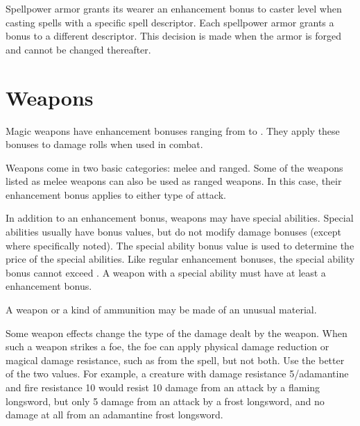 
 Spellpower armor grants its wearer an enhancement bonus to caster level when casting spells with a specific spell descriptor. Each spellpower armor grants a bonus to a different descriptor. This decision is made when the armor is forged and cannot be changed thereafter.

\begin{comment}
\armdescription{Spell resistance}{2 (SR 13); \plus3 (SR 15); \plus4 (SR 17); \plus5 (SR 19)}{10th}{Moderate abjuration}{\x} This property grants the wearer spell resistance while the armor is worn. The spell resistance can be 13, 15, 17, or 19, depending on the armor.

\prereq{Craft Magic Arms and Armor, spell resistance}
\end{comment}

\section{Weapons}

Magic weapons have enhancement bonuses ranging from  to . They apply these bonuses to damage rolls when used in combat.

Weapons come in two basic categories: melee and ranged. Some of the weapons listed as melee weapons can also be used as ranged weapons. In this case, their enhancement bonus applies to either type of attack.

In addition to an enhancement bonus, weapons may have special abilities. Special abilities usually  have bonus values, but do not modify damage bonuses (except where specifically noted). The special ability bonus value is used to determine the price of the special abilities. Like regular enhancement bonuses, the special ability bonus cannot exceed . A weapon with a special ability must have at least a  enhancement bonus.

A weapon or a kind of ammunition may be made of an unusual material.

 Some weapon effects change the type of the damage dealt by the weapon. When such a weapon strikes a foe, the foe can apply physical damage reduction or magical damage resistance, such as from the  spell, but not both. Use the better of the two values. For example, a creature with damage resistance 5/adamantine and fire resistance 10 would resist 10 damage from an attack by a flaming longsword, but only 5 damage from an attack by a frost longsword, and no damage at all from an adamantine frost longsword.

